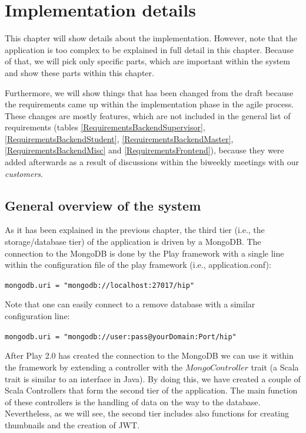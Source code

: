 \chapter[Implementation details]{Implementation details}
\label{implementation}

This chapter will show details about the implementation. However, note that the application is too complex to be explained in full detail in this chapter. Because of that, we will pick only specific parts, which are important within the system and show these parts within this chapter.

Furthermore, we will show things that has been changed from the draft because the requirements came up within the implementation phase in the agile process. These changes are mostly features, which are not included in the general list of requirements (tables \ref{RequirementsBackendSupervisor}, \ref{RequirementsBackendStudent}, \ref{RequirementsBackendMaster}, \ref{RequirementsBackendMisc} and \ref{RequirementsFrontend}), because they were added afterwards as a result of discussions within the biweekly meetings with our \emph{customers}.

\section{General overview of the system}
As it has been explained in the previous chapter, the third tier (i.e., the storage/database tier) of the application is driven by a MongoDB. The connection to the MongoDB is done by the Play framework with a single line within the configuration file of the play framework (i.e., application.conf):

\verb|mongodb.uri = "mongodb://localhost:27017/hip"|

Note that one can easily connect to a remove database with a similar configuration line:

\verb|mongodb.uri = "mongodb://user:pass@yourDomain:Port/hip"|  

After Play 2.0 has created the connection to the MongoDB we can use it within the framework by extending a controller with the $MongoController$ trait (a Scala trait is similar to an interface in Java). By doing this, we have created a couple of Scala Controllers that form the second tier of the application. The main function of these controllers is the handling of data on the way to the database. Nevertheless, as we will see, the second tier includes also functions for creating thumbnails and the creation of \ac{JWT}. 

